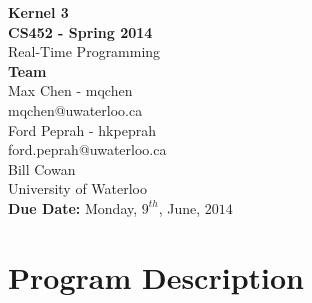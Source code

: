\documentclass[12pt]{article}
\begin{document}
\thispagestyle{empty}
\begin{center}
  {\bf\Large Kernel 3}\\
  {\bf\large CS452 - Spring 2014}\\
  Real-Time Programming\vspace{5cm}\\
  {\bf Team }\\
  Max Chen - mqchen\\
  mqchen@uwaterloo.ca\\[1\baselineskip]
  Ford Peprah - hkpeprah\\
  ford.peprah@uwaterloo.ca\vspace{5cm}\\
  Bill Cowan\\
  University of Waterloo\\
  {\bf Due Date:} Monday, $9^{th}$, June, $2014$
\end{center}
\newpage
\thispagestyle{empty}
\tableofcontents
\newpage
\section{Program Description}
\end{document}
